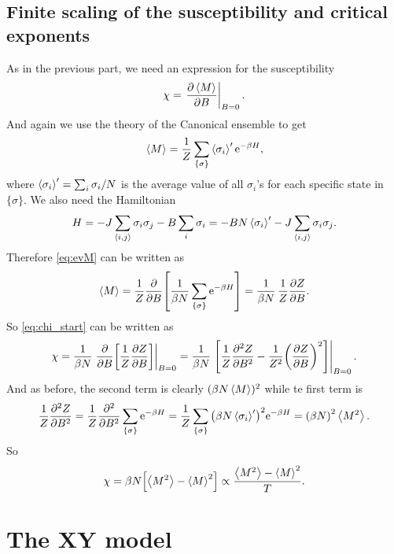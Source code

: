 \documentclass[11pt,letter, swedish, english
]{article}
\begin{document}
\subsection{Finite scaling of the susceptibility and critical exponents}
As in the previous part, we need an expression for the susceptibility
\begin{equation}\label{eq:chi_start}
\chi = \eval{\pdv{\ev{M}}{B}}_{B=0}.
\end{equation}
And again we use the theory of the Canonical ensemble to get
\begin{equation}\label{eq:evM}
\ev{M} = \frac{1}{Z}\sum_{\{\sigma\}} \ev{\sigma_i}'\ee^{-\beta H},
\end{equation}
where $\ev{\sigma_i}' = \sum_i\sigma_i/N$ is the
average\footnotemark{} value of all $\sigma_i$'s for each specific
state in $\{\sigma\}$. We also need the Hamiltonian
\begin{equation}
H = -J\sum_{\ev{i, j}} \sigma_i\sigma_j
-B\sum_{i} \sigma_i
=-BN\ev{\sigma_i}' -J\sum_{\ev{i, j}} \sigma_i\sigma_j.
\end{equation}
Therefore \eqref{eq:evM} can be written as
\begin{equation}
\ev{M} = \frac{1}{Z} 
\pdv{B}\qty[\frac{1}{\beta N}\sum_{\{\sigma\}}\ee^{-\beta H}]
=\frac{1}{\beta N}\,\frac{1}{Z}\pdv{Z}{B}.
\end{equation}
So \eqref{eq:chi_start} can be written as
\begin{equation}
\chi = \frac{1}{\beta N} 
\eval{\pdv{B}\qty[\frac{1}{Z}\pdv{Z}{B}]}_{B=0}
=\frac{1}{\beta N} 
\eval{\qty[\frac{1}{Z}\pdv[2]{Z}{B}
-\frac{1}{Z^2}\qty(\pdv{Z}{B})^2]}_{B=0}.
\end{equation}
And as before, the second term is clearly $(\beta N\ev{M})^2$ while te
first term is
\begin{equation}
\frac{1}{Z}\pdv[2]{Z}{B}
=\frac{1}{Z}\pdv[2]{B}\sum_{\{\sigma\}}\ee^{-\beta H}
=\frac{1}{Z}\sum_{\{\sigma\}}
\qty(\beta N\ev{\sigma_i}')^2\ee^{-\beta H}
=\qty(\beta N)^2\ev{M^2}.
\end{equation}
So
\begin{equation}
\chi =\beta N \qty[\ev{M^2} - \ev{M}^2]
\propto \frac{\ev{M^2} - \ev{M}^2}{T}.
\end{equation}



\section{The XY model}
\end{document}
